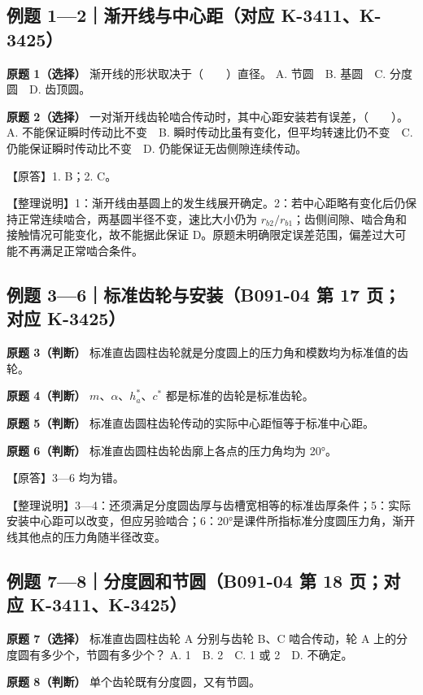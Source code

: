 \documentclass[zihao=5,a4paper,UTF8,fontset=fandol]{ctexart}
\begin{document}
\subsection{例题 1—2｜渐开线与中心距（对应 K-3411、K-3425）}

\textbf{原题 1（选择）} 渐开线的形状取决于（　　）直径。
A. 节圆　B. 基圆　C. 分度圆　D. 齿顶圆。


\textbf{原题 2（选择）} 一对渐开线齿轮啮合传动时，其中心距安装若有误差，（　　）。
A. 不能保证瞬时传动比不变　B. 瞬时传动比虽有变化，但平均转速比仍不变　C. 仍能保证瞬时传动比不变　D. 仍能保证无齿侧隙连续传动。


【原答】1. B；2. C。


【整理说明】1：渐开线由基圆上的发生线展开确定。2：若中心距略有变化后仍保持正常连续啮合，两基圆半径不变，速比大小仍为 $r_{b2}/r_{b1}$；齿侧间隙、啮合角和接触情况可能变化，故不能据此保证 D。原题未明确限定误差范围，偏差过大可能不再满足正常啮合条件。




\subsection{例题 3—6｜标准齿轮与安装（B091-04 第 17 页；对应 K-3425）}

\textbf{原题 3（判断）} 标准直齿圆柱齿轮就是分度圆上的压力角和模数均为标准值的齿轮。


\textbf{原题 4（判断）} $m$、$\alpha$、$h_a^*$、$c^*$ 都是标准的齿轮是标准齿轮。


\textbf{原题 5（判断）} 标准直齿圆柱齿轮传动的实际中心距恒等于标准中心距。


\textbf{原题 6（判断）} 标准直齿圆柱齿轮齿廓上各点的压力角均为 20°。


【原答】3—6 均为错。


【整理说明】3—4：还须满足分度圆齿厚与齿槽宽相等的标准齿厚条件；5：实际安装中心距可以改变，但应另验啮合；6：20°是课件所指标准分度圆压力角，渐开线其他点的压力角随半径改变。


\subsection{例题 7—8｜分度圆和节圆（B091-04 第 18 页；对应 K-3411、K-3425）}

\textbf{原题 7（选择）} 标准直齿圆柱齿轮 A 分别与齿轮 B、C 啮合传动，轮 A 上的分度圆有多少个，节圆有多少个？
A. 1　B. 2　C. 1 或 2　D. 不确定。


\textbf{原题 8（判断）} 单个齿轮既有分度圆，又有节圆。
\end{document}
